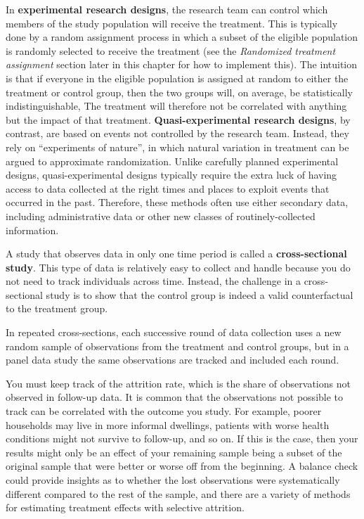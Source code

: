 In \textbf{experimental research designs},
 
the research team can control which members
of the study population will receive the treatment.
This is typically done by a random assignment process
in which a subset of the eligible population
is randomly selected to receive the treatment
(see the \textit{Randomized treatment assignment} section
later in this chapter for how to implement this).
The intuition is that if everyone in the eligible population
is assigned at random to either the treatment or control group,
then the two groups will, on average, be statistically indistinguishable,
The treatment will therefore not be correlated with anything
but the impact of that treatment.\cite{duflo2007using}
\textbf{Quasi-experimental research designs},
by contrast, are based on events not controlled by the research team.
Instead, they rely on ``experiments of nature'',
in which natural variation in treatment can be argued to approximate randomization.
Unlike carefully planned experimental designs,
quasi-experimental designs typically require the extra luck
of having access to data collected at the right times and places
to exploit events that occurred in the past.
Therefore, these methods often use either secondary data,
including administrative data or other new classes of routinely-collected information.

A study that observes data in only one time period is called
a \textbf{cross-sectional study}.
This type of data is relatively easy to collect and handle because
you do not need to track individuals across time.
Instead, the challenge in a cross-sectional study is to
show that the control group is indeed a valid counterfactual to the treatment group.


In repeated cross-sections,
each successive round of data collection uses a new random sample
of observations from the treatment and control groups,
but in a panel data study the same observations are tracked and included each round.

You must keep track of the attrition rate,
which is the share of observations not observed in follow-up data.
It is common that the observations not possible to track
can be correlated with the outcome you study.
For example, poorer households may live in more informal dwellings,
patients with worse health conditions might not survive to follow-up,
and so on.
If this is the case, then your results might only be an effect of your remaining sample
being a subset of the original sample that were better or worse off from the beginning.
A balance check could provide insights
as to whether the lost observations were systematically different
compared to the rest of the sample,
and there are a variety of methods for estimating treatment effects
with selective attrition.

